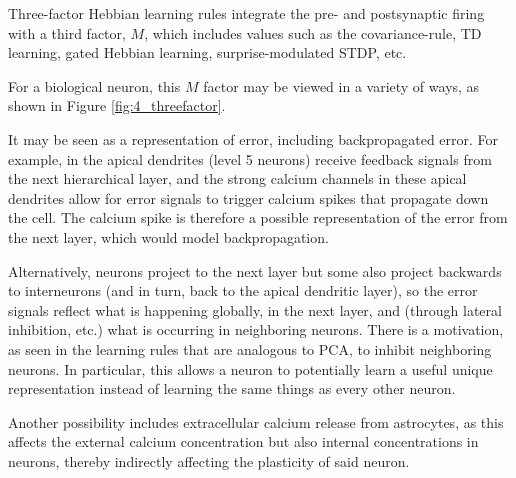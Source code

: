 \documentclass[main]{subfiles}
\begin{document}
Three-factor Hebbian learning rules integrate the pre- and postsynaptic firing with a third factor, $M$, which includes values such as the covariance-rule, TD learning, gated Hebbian learning, surprise-modulated STDP, etc.

For a biological neuron, this $M$ factor may be viewed in a variety of ways, as shown in Figure \ref{fig:4_threefactor}.

It may be seen as a representation of error, including backpropagated error. For example, in the apical dendrites (level 5 neurons) receive feedback signals from the next hierarchical layer, and the strong calcium channels in these apical dendrites allow for error signals to trigger calcium spikes that propagate down the cell. The calcium spike is therefore a possible representation of the error from the next layer, which would model backpropagation.

Alternatively, neurons project to the next layer but some also project backwards to interneurons (and in turn, back to the apical dendritic layer), so the error signals reflect what is happening globally, in the next layer, and (through lateral inhibition, etc.) what is occurring in neighboring neurons. There is a motivation, as seen in the learning rules that are analogous to PCA, to inhibit neighboring neurons. In particular, this allows a neuron to potentially learn a useful unique representation instead of learning the same things as every other neuron.

Another possibility includes extracellular calcium release from astrocytes, as this affects the external calcium concentration but also internal concentrations in neurons, thereby indirectly affecting the plasticity of said neuron.
\end{document}
